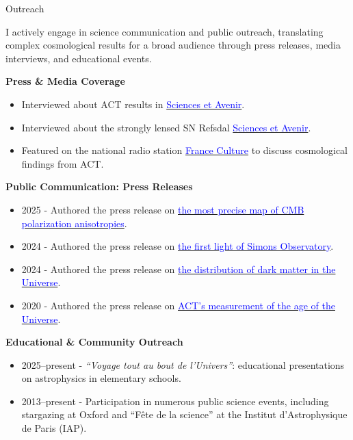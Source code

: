 \documentclass{resume} %
\newcommand{\TIB}[1]{\textcolor{blue}{#1}}
\begin{document}
\begin{rSection}{Outreach}

I actively engage in science communication and public outreach, translating complex cosmological results for a broad audience through press releases, media interviews, and educational events.

\textbf{Press \& Media Coverage}
\begin{itemize}
  \item Interviewed about ACT results in \href{https://www.sciencesetavenir.fr/espace/univers/une-nouvelle-mesure-de-la-constante-de-hubble-confirme-celle-du-satellite-planck_150719}{\TIB{Sciences et Avenir}}.
   \item Interviewed about the strongly lensed SN Refsdal \href{https://www.sciencesetavenir.fr/espace/astrophysique/le-mystere-persistant-du-taux-d-expansion-de-l-univers_171338}{\TIB{Sciences et Avenir}}.
  \item Featured on the national radio station \href{https://media.radiofrance-podcast.net/2021/2/2/NET_MFC_ee6d807d-2c74-49cd-9f1e-7c7d66957f58.mp3}{\TIB{France Culture}} to discuss cosmological findings from ACT.
\end{itemize}

\textbf{Public Communication: Press Releases}
\begin{itemize}
  \item 2025 - Authored the press release on \href{https://www.in2p3.cnrs.fr/fr/cnrsinfo/mesure-de-la-polarisation-du-fond-diffus-cosmologique-par-la-collaboration-act-une-fenetre/}{\TIB{the most precise map of CMB polarization anisotropies}}.
  \item 2024 - Authored the press release on \href{https://www.in2p3.cnrs.fr/en/cnrsinfo/search-echo-big-bang-simons-observatory}{\TIB{the first light of Simons Observatory}}.
  \item 2024 - Authored the press release on \href{https://www.in2p3.cnrs.fr/fr/cnrsinfo/la-collaboration-act-devoile-une-nouvelle-carte-de-la-distribution-de-la-matiere-noire}{\TIB{the distribution of dark matter in the Universe}}.
  \item 2020 - Authored the press release on \href{https://www.ijclab.in2p3.fr/actualite/act-leve-le-voile-sur-lage-de-lunivers/}{\TIB{ACT's measurement of the age of the Universe}}.
\end{itemize}

\textbf{Educational \& Community Outreach}
\begin{itemize}
  \item 2025–present - \textit{“Voyage tout au bout de l'Univers”}: educational presentations on astrophysics in elementary schools.
  \item 2013–present - Participation in numerous public science events, including stargazing at Oxford and “Fête de la science” at the Institut d’Astrophysique de Paris (IAP).
\end{itemize}

\end{rSection}
\end{document}
